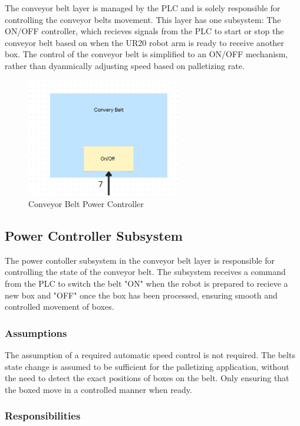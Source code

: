 The conveyor belt layer is managed by the PLC and is solely responsible for controlling the conveyor belts movement. This layer has one subsystem: The ON/OFF controller, which recieves signals from the PLC to start or stop the conveyor belt based on when the UR20 robot arm is ready to receive another box. The control of the conveyor belt is simplified to an ON/OFF mechanism, rather than dyanmically adjusting speed based on palletizing rate.

\begin{figure}[h!]
	\centering
 	\includegraphics[width=0.60\textwidth]{images/convery_belt}
 \caption{Conveyor Belt Power Controller}
\end{figure}
\subsection{Power Controller Subsystem}
The power contoller subsystem in the conveyor belt layer is responsible for controlling the state of the conveyor belt. The subsystem receives a command from the PLC to switch the belt "ON" when the robot is prepared to recieve a new box and "OFF" once the box has been processed, ensuring smooth and controlled movement of boxes.
\subsubsection{Assumptions}
The assumption of a required automatic speed control is not required. The belts state change is assumed to be sufficient for the palletizing application, without the need to detect the exact positions of boxes on the belt. Only ensuring that the boxed move in a controlled manner when ready.

\subsubsection{Responsibilities}

